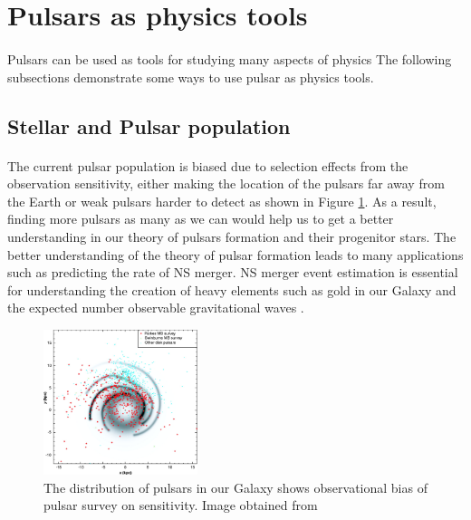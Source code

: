 \documentclass[thesis_msc.tex]{subfiles}
\begin{document}
\section{Pulsars as physics tools}
    \paragraph{} Pulsars can be used as tools for studying many aspects of physics %
    The following subsections demonstrate some ways to use pulsar as physics tools.  

    \subsection{Stellar and Pulsar population} 
    \paragraph{} The current pulsar population is biased due to selection effects from the observation sensitivity, either making the location of the pulsars far away from the Earth or weak pulsars harder to detect as shown in Figure \ref{pdist}. As a result, finding more pulsars as many as we can would help us to get a better understanding in our theory of pulsars formation and their progenitor stars. The better understanding of the theory of pulsar formation leads to many applications such as predicting the rate of NS merger. NS merger event estimation is essential for understanding the creation of heavy elements such as gold in our Galaxy \citep{Thielemann:2017acv} and the expected number observable gravitational waves \citep{0034-4885-72-7-076901}.
        \begin{figure}[h] \centering
\includegraphics[width=0.4\textwidth]{figures/F1_large.jpg}
\caption{The distribution of pulsars in our Galaxy shows observational bias of pulsar survey on sensitivity. Image obtained from \citep{Manchester542}  }
\label{pdist}
\end{figure}
\end{document}
